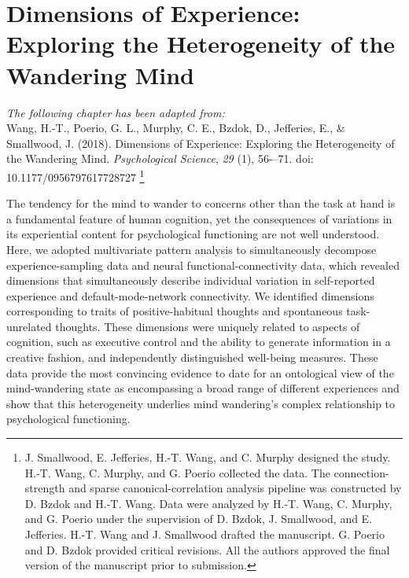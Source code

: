 \chapter{Dimensions of Experience: Exploring the Heterogeneity of the Wandering Mind}
\label{ch:study1}
\setcounter{equation}{0}

\textit{The following chapter has been adapted from:\\}
Wang, H.-T., Poerio, G. L., Murphy, C. E., Bzdok, D., Jefferies, E., \& Smallwood, J. (2018). Dimensions of Experience: Exploring the Heterogeneity of the Wandering Mind. \textit{Psychological Science}, \textit{29} (1), 56-–71. doi: 10.1177/0956797617728727
\footnote{
J. Smallwood, E. Jefferies, H.-T. Wang, and C. Murphy designed the study. H.-T. Wang, C. Murphy, and G. Poerio collected the data. The connection-strength and sparse canonical-correlation analysis pipeline was constructed by D. Bzdok and H.-T. Wang. Data were analyzed by H.-T. Wang, C. Murphy, and G. Poerio under the supervision of D. Bzdok, J. Smallwood, and E. Jefferies. H.-T. Wang and J. Smallwood drafted the manuscript. G. Poerio and D. Bzdok provided critical revisions. All the authors approved the final version of the manuscript prior to submission.
}\\

\newpage

\noindent{}The tendency for the mind to wander to concerns other than the task at hand is a fundamental feature of human cognition, yet the consequences of variations in its experiential content for psychological functioning are not well understood. Here, we adopted multivariate pattern analysis to simultaneously decompose experience-sampling data and neural functional-connectivity data, which revealed dimensions that simultaneously describe individual variation in self-reported experience and default-mode-network connectivity. We identified dimensions corresponding to traits of positive-habitual thoughts and spontaneous task-unrelated thoughts. These dimensions were uniquely related to aspects of cognition, such as executive control and the ability to generate information in a creative fashion, and independently distinguished well-being measures. These data provide the most convincing evidence to date for an ontological view of the mind-wandering state as encompassing a broad range of different experiences and show that this heterogeneity underlies mind wandering's complex relationship to psychological functioning.

